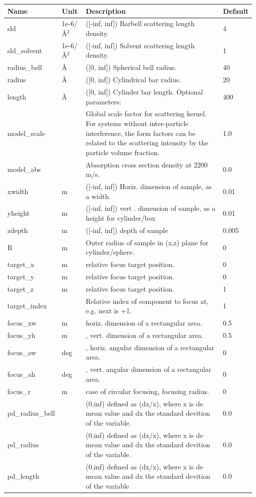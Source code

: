 \begin{longtable}{p{}p{}p{}p{}}
\toprule
\textbf{Name} & \textbf{Unit} & \textbf{Description} & \textbf{Default} \\
\midrule
\endhead
sld & 1e-6/\AA{}$^{2}$ & ([-inf, inf]) Barbell scattering length density. & 4 \\
sld\_solvent & 1e-6/\AA{}$^{2}$ & ([-inf, inf]) Solvent scattering length density. & 1 \\
radius\_bell & \AA{} & ([0, inf]) Spherical bell radius. & 40 \\
radius & \AA{} & ([0, inf]) Cylindrical bar radius. & 20 \\
length & \AA{} & ([0, inf]) Cylinder bar length. Optional parameters: & 400 \\
model\_scale &   & Global scale factor for scattering kernel. For systems without inter-particle interference, the form factors can be related to the scattering intensity by the particle volume fraction. & 1.0 \\
model\_abs &   & Absorption cross section density at 2200 m/s. & 0.0 \\
xwidth & m & ([-inf, inf]) Horiz. dimension of sample, as a width. & 0.01 \\
yheight & m & ([-inf, inf]) vert . dimension of sample, as a height for cylinder/box & 0.01 \\
zdepth & m & ([-inf, inf]) depth of sample & 0.005 \\
R & m & Outer radius of sample in (x,z) plane for cylinder/sphere. & 0 \\
target\_x & m & relative focus target position. & 0 \\
target\_y & m & relative focus target position. & 0 \\
target\_z & m & relative focus target position. & 1 \\
target\_index &   & Relative index of component to focus at, e.g. next is +1. & 1 \\
focus\_xw & m & horiz. dimension of a rectangular area. & 0.5 \\
focus\_yh & m & , vert. dimension of a rectangular area. & 0.5 \\
focus\_aw & deg & , horiz. angular dimension of a rectangular area. & 0 \\
focus\_ah & deg & , vert. angular dimension of a rectangular area. & 0 \\
focus\_r & m & case of circular focusing, focusing radius. & 0 \\
pd\_radius\_bell &  & (0,inf) defined as (dx/x), where x is de mean value and dx the standard devition of the variable. & 0.0 \\
pd\_radius &  & (0,inf) defined as (dx/x), where x is de mean value and dx the standard devition of the variable. & 0.0 \\
pd\_length &  & (0,inf) defined as (dx/x), where x is de mean value and dx the standard devition of the variable & 0.0 \\
\bottomrule
\end{longtable}

